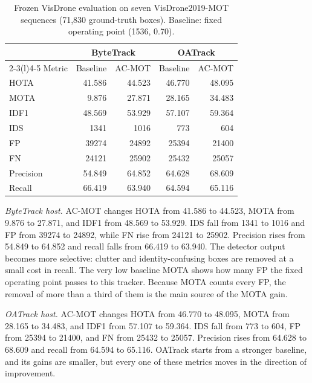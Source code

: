 \documentclass[journal]{new-aiaa}
\begin{document}
\begin{table}[htbp]
\caption{Frozen VisDrone evaluation on seven VisDrone2019-MOT sequences
(71,830 ground-truth boxes). Baseline: fixed operating point (1536, 0.70).}
\label{tab:visdrone}
\centering\footnotesize
\setlength{\tabcolsep}{4pt}
\begin{tabular}{@{}lrrrr@{}}
\toprule
 & \multicolumn{2}{c}{ByteTrack} & \multicolumn{2}{c}{OATrack}\\
\cmidrule(lr){2-3}\cmidrule(l){4-5}
Metric & Baseline & AC-MOT & Baseline & AC-MOT\\
\midrule
HOTA & 41.586 & 44.523 & 46.770 & 48.095\\
MOTA & 9.876 & 27.871 & 28.165 & 34.483\\
IDF1 & 48.569 & 53.929 & 57.107 & 59.364\\
IDS & 1341 & 1016 & 773 & 604\\
FP & 39274 & 24892 & 25394 & 21400\\
FN & 24121 & 25902 & 25432 & 25057\\
Precision & 54.849 & 64.852 & 64.628 & 68.609\\
Recall & 66.419 & 63.940 & 64.594 & 65.116\\
\bottomrule
\end{tabular}
\end{table}

\emph{ByteTrack host.} AC-MOT changes HOTA from 41.586 to 44.523, MOTA from
9.876 to 27.871, and IDF1 from 48.569 to 53.929. IDS fall from 1341 to 1016
and FP from 39274 to 24892, while FN rise from 24121 to 25902. Precision rises
from 54.849 to 64.852 and recall falls from 66.419 to 63.940. The detector
output becomes more selective: clutter and identity-confusing boxes are
removed at a small cost in recall. The very low baseline MOTA shows how many
FP the fixed operating point passes to this tracker. Because
MOTA counts every FP, the removal of more than a third of them is
the main source of the MOTA gain.

\emph{OATrack host.} AC-MOT changes HOTA from 46.770 to 48.095, MOTA from
28.165 to 34.483, and IDF1 from 57.107 to 59.364. IDS fall from 773 to 604, FP
from 25394 to 21400, and FN from 25432 to 25057. Precision rises from 64.628 to
68.609 and recall from 64.594 to 65.116. OATrack starts from a stronger
baseline, and its gains are smaller, but every one of these metrics moves in
the direction of improvement.
\end{document}

